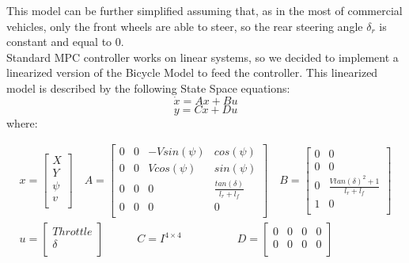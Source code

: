 This model can be further simplified assuming that, as in the most of commercial vehicles, only the front wheels are able to steer, so the rear steering angle $\delta_r$ is constant and equal to 0.\\
Standard MPC controller works on linear systems, so we decided to implement a linearized version of the Bicycle Model to feed the controller. This linearized model is described by the following State Space equations:
\begin{equation}
    \label{equation:dynamic1}
    \Dot{x} = Ax + Bu 
\end{equation}
\begin{equation}
    \label{equation:dynamic2}
    y = Cx + Du 
\end{equation}
where:

\begin{equation}
\label{equation:sys_bicycle_kin}
   \begin{aligned}
    x = 
        \begin{bmatrix} %
        X \\ 
        Y \\
        \psi \\
        v \\
        \end{bmatrix}\quad
    A =
        \begin{bmatrix} %
       0 & 0 & -Vsin(\psi) & cos(\psi)\\ 
       0 & 0 & Vcos(\psi) & sin(\psi) \\
       0 & 0 & 0 & \frac{tan(\delta)}{l_r + l_f}\\
       0 & 0 & 0 & 0 \\
        \end{bmatrix}\quad
    B = 
        \begin{bmatrix} %
        0 & 0\\ 
        0 & 0 \\
        0 & \frac{Vtan(\delta)^2 + 1}{l_r + l_f}\\
        1 & 0 \\
        \end{bmatrix}\\[10pt]
    u =
        \begin{bmatrix} %
        Throttle \\
        \delta \\
        \end{bmatrix}\quad\quad\quad
    C = I^{4\times 4}\quad\quad\quad\quad\quad
    D =
        \begin{bmatrix} %
      0 & 0 & 0 & 0\\
      0 & 0 & 0 & 0\\
        \end{bmatrix}
    \end{aligned}
\end{equation} 

